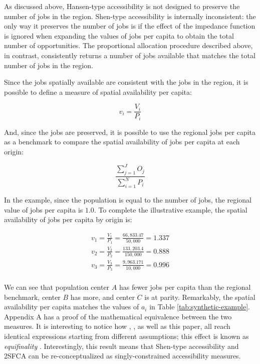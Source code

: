\documentclass[]{elsarticle} %
\begin{document}
As discussed above, Hansen-type accessibility is not designed to
preserve the number of jobs in the region. Shen-type accessibility is
internally inconsistent: the only way it preserves the number of jobs is
if the effect of the impedance function is ignored when expanding the
values of jobs per capita to obtain the total number of opportunities.
The proportional allocation procedure described above, in contrast,
consistently returns a number of jobs available that matches the total
number of jobs in the region.

Since the jobs spatially available are consistent with the jobs in the
region, it is possible to define a measure of spatial availability per
capita:

\begin{equation}
\label{eq:SA-per-capita}
v_i = \frac{V_i}{P_i}
\end{equation}

And, since the jobs are preserved, it is possible to use the regional
jobs per capita as a benchmark to compare the spatial availability of
jobs per capita at each origin:

\begin{equation}
\label{eq:Regional-jobs-per-capita}
\frac{\sum_{j=1}^J O_j}{\sum_{i=1}^N P_i}
\end{equation}

In the example, since the population is equal to the number of jobs, the
regional value of jobs per capita is \(1.0\). To complete the
illustrative example, the spatial availability of jobs per capita by
origin is:

\begin{equation}
\label{eq:SA-per-capita-2populations}
\begin{array}{l}
v_{1} = \frac{V_1}{P_1} =  \frac{66,833.47}{50,000} = 1.337\\
v_{2} =  \frac{V_{2}}{P_2} =  \frac{133,203.4}{150,000} = 0.888\\
v_{3} =  \frac{V_{3}}{P_3} =  \frac{9,963.171}{10,000} = 0.996\\
\end{array}
\end{equation}

We can see that population center \(A\) has fewer jobs per capita than
the regional benchmark, center \(B\) has more, and center \(C\) is at
parity. Remarkably, the spatial availability per capita matches the
values of \(a_i\) in Table \ref{tab:synthetic-example}. Appendix A has a
proof of the mathematical equivalence between the two measures. It is
interesting to notice how \citet{weibull_axiomatic_1976},
\citet{shen1998}, as well as this paper, all reach identical expressions
starting from different assumptions; this effect is known as
\emph{equifinality}
\citetext{\citealp[see][p.~333]{ortuzar_2011_modelling}; \citealp[and][]{williams_hall_1981}}.
Interestingly, this result means that Shen-type accessibility and 2SFCA
can be re-conceptualized as singly-constrained accessibility measures.
\end{document}
